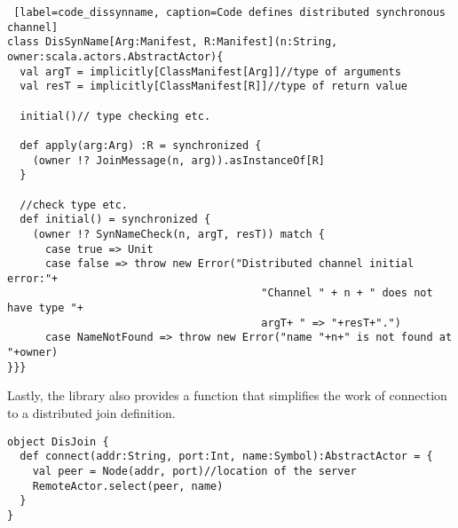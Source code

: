 \begin{lstlisting} [label=code_dissynname, caption=Code defines distributed synchronous channel]
class DisSynName[Arg:Manifest, R:Manifest](n:String, owner:scala.actors.AbstractActor){
  val argT = implicitly[ClassManifest[Arg]]//type of arguments
  val resT = implicitly[ClassManifest[R]]//type of return value
  
  initial()// type checking etc.
  
  def apply(arg:Arg) :R = synchronized {
    (owner !? JoinMessage(n, arg)).asInstanceOf[R]
  }
  
  //check type etc.
  def initial() = synchronized {
    (owner !? SynNameCheck(n, argT, resT)) match {
      case true => Unit
      case false => throw new Error("Distributed channel initial error:"+
                                        "Channel " + n + " does not have type "+
                                        argT+ " => "+resT+".")
      case NameNotFound => throw new Error("name "+n+" is not found at "+owner)
}}}
\end{lstlisting}

Lastly, the library also provides a function that simplifies the work of connection to a distributed join definition.

\begin{lstlisting}
object DisJoin {
  def connect(addr:String, port:Int, name:Symbol):AbstractActor = {
    val peer = Node(addr, port)//location of the server
    RemoteActor.select(peer, name)
  }
}
\end{lstlisting}